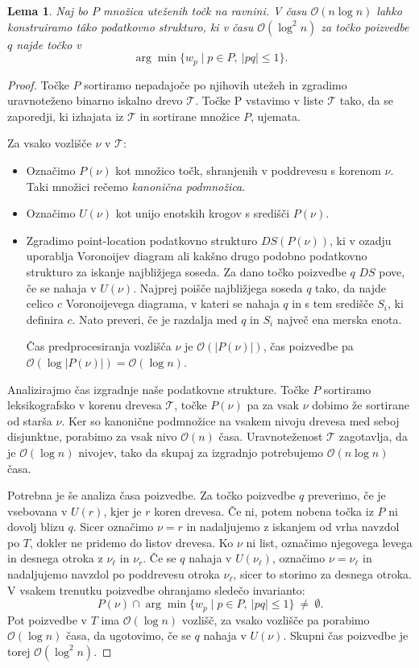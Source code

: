 \documentclass[a4paper, 12pt]{book}
\newcommand{\T}{\ensuremath{\mathcal{T}}}
\newcommand{\OO}{\ensuremath{\mathcal{O}}} %
\newtheorem{lema}[izrek]{Lema}
\begin{document}
\begin{lema}
\label{le:ds2}
    Naj bo $P$ množica uteženih točk na ravnini. V času $\OO(n\log n)$ lahko konstruiramo t\^{a}ko podatkovno strukturo, ki v času $\OO(\log^2 n)$ za točko poizvedbe $q$ najde točko v 
	\[	\arg\min \{ w_p \mid p\in P,~|pq|\le 1\}.
	\]
\end{lema}
\begin{proof}
Točke $P$ sortiramo nepadajoče po njihovih utežeh in zgradimo uravnoteženo binarno iskalno drevo $\T$. Točke P vstavimo v liste $\T$ tako, da se zaporedji, ki izhajata iz $\T$ in sortirane množice $P$, ujemata.

Za vsako vozlišče $\nu$ v $\T$:
\begin{itemize}
\item Označimo $P(\nu)$ kot množico točk, shranjenih v poddrevesu s korenom $\nu$. Taki množici rečemo \emph{kanonična podmnožica}.
\item Označimo $U(\nu)$ kot unijo enotskih krogov s središči $P(\nu)$.
\item Zgradimo point-location podatkovno strukturo $DS(P(\nu))$, ki v ozadju uporablja Voronoijev diagram ali kakšno drugo podobno podatkovno strukturo za iskanje najbližjega soseda. Za dano točko poizvedbe $q$ $DS$ pove, če se nahaja v $U(\nu)$. Najprej poišče najbližjega soseda $q$ tako, da najde celico $c$ Voronoijevega diagrama, v kateri se nahaja $q$ in s tem središče $S_i$, ki definira $c$. Nato preveri, če je razdalja med $q$ in $S_i$ največ ena merska enota.

Čas predprocesiranja vozlišča $\nu$ je $ \OO(|P(\nu)|)$, čas poizvedbe pa $\OO(\log |P(\nu)|)= \OO(\log n)$.
\end{itemize}

Analizirajmo čas izgradnje naše podatkovne strukture. Točke $P$ sortiramo leksikografsko v korenu drevesa $\T$, točke $P(\nu)$ pa za vsak $\nu$ dobimo že sortirane od starša $\nu$. Ker so kanonične podmnožice na vsakem nivoju drevesa med seboj disjunktne, porabimo za vsak nivo $\OO(n)$ časa. Uravnoteženost $\T$ zagotavlja, da je $\OO(\log n)$ nivojev, tako da skupaj za izgradnjo potrebujemo $\OO(n\log n)$ časa.

Potrebna je še analiza časa poizvedbe. Za točko poizvedbe $q$ preverimo, če je vsebovana v $U(r)$, kjer je $r$ koren drevesa. Če ni, potem nobena točka iz $P$ ni dovolj blizu $q$. Sicer označimo $\nu = r$ in nadaljujemo z iskanjem od vrha navzdol po $T$, dokler ne pridemo do listov drevesa. Ko $\nu$ ni list, označimo njegovega levega in desnega otroka z $\nu_\ell$ in $\nu_r$. Če se $q$ nahaja v $U(\nu_\ell)$, označimo $\nu = \nu_\ell$ in nadaljujemo navzdol po poddrevesu otroka $\nu_\ell$, sicer to storimo za desnega otroka. V vsakem trenutku poizvedbe ohranjamo sledečo invarianto:
\[	P(\nu) \cap \arg\min \{ w_p \mid p\in P,~|pq|\le 1\} ~\not=~ \emptyset.
	\]	
Pot poizvedbe v $T$ ima $\OO(\log n)$ vozlišč, za vsako vozlišče pa porabimo $\OO(\log n)$ časa, da ugotovimo, če se $q$ nahaja v $U(\nu)$. Skupni čas poizvedbe je torej $\OO(\log^2 n)$.
\end{proof}
\end{document}
